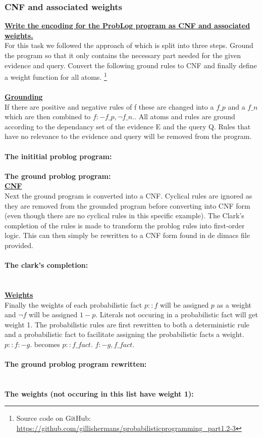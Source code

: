 \documentclass{article}
\begin{document}
\subsubsection{CNF and associated weights}
\underline{\textbf{Write the encoding for the ProbLog program as CNF and associated weights.}}
\\
For this task we followed the approach of \cite{Fierens} which is split into three steps. Ground the program so that it only contains the necessary part needed for the given evidence and query. Convert the following ground rules to CNF and finally define a weight function for all atoms. \footnote{Source code on GitHub: \href{https://github.com/gillishermans/probabilisticprogramming_part1.2-3}{https://github.com/gillishermans/probabilisticprogramming_part1.2-3}}
\\\\
\underline{\textbf{Grounding}}
\\
If there are positive and negative rules of f these are changed into a $f\_p$ and a $f\_n$ which are then combined to $f :- f\_p,  \neg f\_n.$. All atoms and rules are ground according to the dependancy set of the evidence E and the query Q. Rules that have no relevance to the evidence and query will be removed from the program. 
\\\\
\textbf{The inititial problog program:}
\\

\\
\textbf{The ground problog program:}
\\

\underline{\textbf{CNF}}
\\
Next the ground program is converted into a CNF. Cyclical rules are ignored as they are removed from the grounded program before converting into CNF form (even though there are no cyclical rules in this specific example). The Clark's completion of the rules is made to transform the problog rules into first-order logic. This can then simply be rewritten to a CNF form found in de dimacs file provided.
\\\\
\textbf{The clark's completion:}
\\

\\\\
\underline{\textbf{Weights}}
\\
Finally the weights of each probabilistic fact $p::f$ will be assigned $p$ as a weight and $\neg f$ will be assigned $1-p$. Literals not occuring in a probabilistic fact will get weight 1. The probabilistic rules are first rewritten to both a deterministic rule and a probabilistic fact to facilitate assigning the probabilistic facts a weight. $p :: f :- g.$ becomes $p :: f\_fact.$ $f :- g, f\_fact.$
\\\\
\textbf{The ground problog program rewritten:}
\\

\\\\
\textbf{The weights (not occuring in this list have weight 1):}
\\

\end{document}
